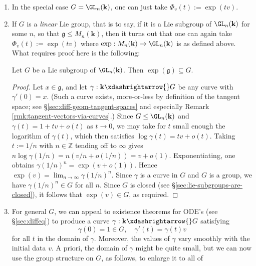 \documentclass[reqno]{amsart} 
\begin{document}
\begin{enumerate}
\item 
  In the special case $G = \GL_n(\mathbf{k})$,
  one can just take $\Phi_v(t) := \exp(t v)$.
\item If $G$ is a \emph{linear} Lie group, that is to say, if it
  is a Lie subgroup of $\GL_n(\mathbf{k})$ for some $n$, so that
  $\mathfrak{g} \leq M_n(\mathbf{k})$, then it turns out that one can
  again take $\Phi_v(t) := \exp(t v)$
  where $\exp : M_n(\mathbf{k}) \rightarrow \GL_n(\mathbf{k})$
  is 
  as defined above.
  What requires proof here
  is the following:
  \begin{lemma}
    Let $G$ be a Lie subgroup of $\GL_n(\mathbf{k})$.
    Then $\exp(\mathfrak{g}) \subseteq G$.
  \end{lemma}
  \begin{proof}
    Let $x \in \mathfrak{g}$, and let
    $\gamma : \mathbf{k} \xdashrightarrow{} G$ be any curve with
    $\gamma '(0) = x$.  (Such a curve exists, more-or-less by
    definition of the tangent space; see
    \S\ref{sec:diff-geom-tangent-spaces} and especially Remark
    \ref{rmk:tangent-vectors-via-curves}.)  Since
    $G \leq \GL_n(\mathbf{k})$ and 
    $\gamma(t) = 1 + t v + o(t)$ as $t \rightarrow 0$, we may
    take for $t$ small enough the logarithm of $\gamma(t)$,
    which then satisfies
    $\log \gamma (t) = t v + o(t)$.  Taking
    $t := 1/n$ with $n \in \mathbb{Z}$ tending off to $\infty$
    gives $n \log \gamma(1/n) = n ( v/n + o(1/n)) = v + o(1)$.
    Exponentiating, one obtains $\gamma(1/n)^n = \exp(v + o(1))$.
    Hence $\exp(v) = \lim_{n \rightarrow \infty} \gamma(1/n)^n$.
    Since $\gamma$ is a curve in $G$ and $G$ is a group, we have
    $\gamma(1/n)^n \in G$ for all $n$.  Since $G$ is closed (see
    \S\ref{sec:lie-subgroups-are-closed}), it follows that
    $\exp(v) \in G$, as required.
  \end{proof}
\item For general $G$, we can appeal to existence theorems for
  ODE's (see \S\ref{sec:diffeq})  to produce a curve
  $\gamma : \mathbf{k} \xdashrightarrow{} G$ satisfying
  \begin{equation}\label{eq:curve-in-G-used-to-produce-exp}
    \gamma(0) = 1 \in G,
    \quad \gamma'(t) = \gamma(t) v
  \end{equation}
  for all $t$ in the domain of $\gamma$.  
  Moreover, the values of $\gamma$ vary smoothly
  with the initial data $v$.  A priori, the domain
  of $\gamma$ might be quite small, but we can now use the group
  structure on $G$, as follows, to enlarge it to all of

\end{enumerate}
\end{document}
